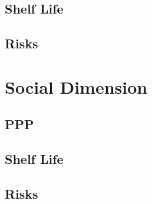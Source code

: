 \subsection{Shelf Life}
\subsection{Risks}

\section{Social Dimension}
\subsection{PPP}
\subsection{Shelf Life}
\subsection{Risks}